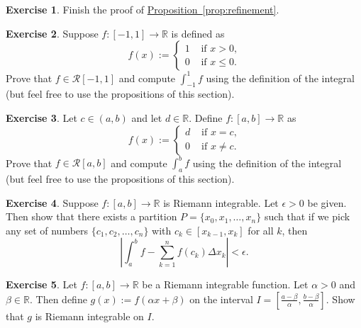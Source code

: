 \documentclass[12pt]{book}
\newcommand{\abs}[1]{\left\lvert {#1} \right\rvert}
\newcommand{\R}{{\mathbb{R}}}
\newcommand{\sR}{{\mathcal{R}}}
\theoremstyle{plain}
\theoremstyle{remark}
\theoremstyle{definition}
\theoremstyle{exercise}
\newtheorem{exercise}{Exercise}[section]
\theoremstyle{example}
\newcommand{\propref}[1]{\hyperref[#1]{Proposition~\ref*{#1}}}
\begin{document}
\begin{exercise}
Finish the proof of \propref{prop:refinement}.
\end{exercise}

\begin{exercise}
Suppose $f \colon [-1,1] \to \R$ is defined as
\begin{equation*}
f(x) :=
\begin{cases}
1 & \text{ if $x > 0$,} \\
0 & \text{ if $x \leq 0$.}
\end{cases}
\end{equation*}
Prove that $f \in \sR[-1,1]$ and
compute $\int_{-1}^1 f$ using the definition of the integral
(but
feel free to use the propositions of this section).
\end{exercise}

\begin{exercise}
Let $c \in (a,b)$ and let $d \in \R$.
Define $f \colon [a,b] \to \R$ as
\begin{equation*}
f(x) :=
\begin{cases}
d & \text{ if $x = c$,} \\
0 & \text{ if $x \not= c$.}
\end{cases}
\end{equation*}
Prove that $f \in \sR[a,b]$ and
compute
$\int_a^b f$ using the definition of the integral
(but
feel free to use the propositions of this section).
\end{exercise}

\begin{exercise} \label{exercise:taggedpartition}
Suppose $f \colon [a,b] \to \R$ is Riemann integrable.  Let $\epsilon
> 0$ be given.  Then show that there exists a partition $P = \{ x_0, x_1,
\ldots, x_n \}$
such that if we
pick any set of numbers $\{ c_1, c_2, \ldots, c_n \}$ with
$c_k \in [x_{k-1},x_k]$ for all $k$, then
\begin{equation*}
\abs{\int_a^b f - \sum_{k=1}^n f(c_k) \Delta x_k} < \epsilon .
\end{equation*}
\end{exercise}

\begin{exercise}
Let $f \colon [a,b] \to \R$ be a Riemann integrable function.
Let $\alpha > 0$ and $\beta \in \R$.
Then define $g(x) := f(\alpha x + \beta)$ on the interval
$I = [\frac{a-\beta}{\alpha}, \frac{b-\beta}{\alpha}]$.  Show
that $g$ is Riemann integrable on $I$.
\end{exercise}
\end{document}
